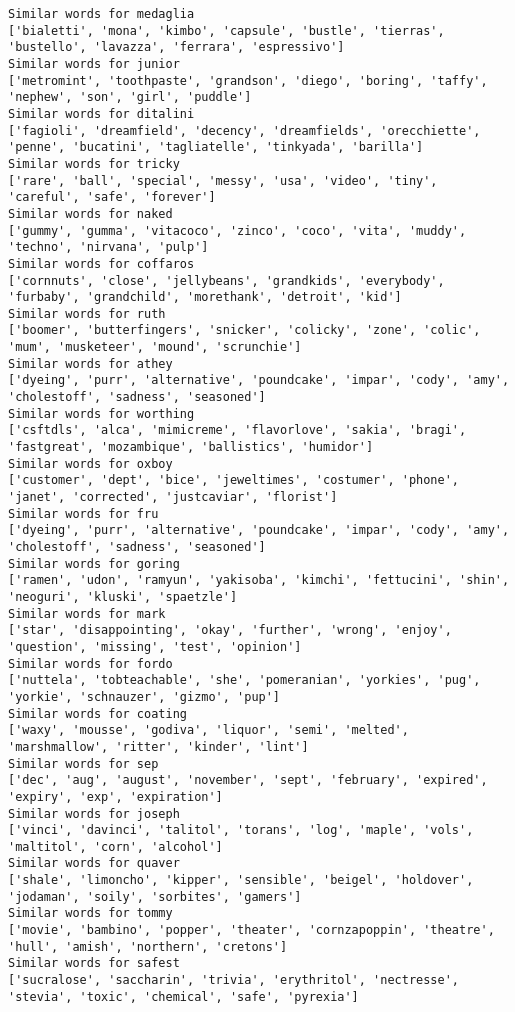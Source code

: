 \documentclass[11pt]{article}
\begin{document}
\begin{Verbatim}[commandchars=\\\{\}]
Similar words for medaglia
['bialetti', 'mona', 'kimbo', 'capsule', 'bustle', 'tierras', 'bustello', 'lavazza', 'ferrara', 'espressivo']
Similar words for junior
['metromint', 'toothpaste', 'grandson', 'diego', 'boring', 'taffy', 'nephew', 'son', 'girl', 'puddle']
Similar words for ditalini
['fagioli', 'dreamfield', 'decency', 'dreamfields', 'orecchiette', 'penne', 'bucatini', 'tagliatelle', 'tinkyada', 'barilla']
Similar words for tricky
['rare', 'ball', 'special', 'messy', 'usa', 'video', 'tiny', 'careful', 'safe', 'forever']
Similar words for naked
['gummy', 'gumma', 'vitacoco', 'zinco', 'coco', 'vita', 'muddy', 'techno', 'nirvana', 'pulp']
Similar words for coffaros
['cornnuts', 'close', 'jellybeans', 'grandkids', 'everybody', 'furbaby', 'grandchild', 'morethank', 'detroit', 'kid']
Similar words for ruth
['boomer', 'butterfingers', 'snicker', 'colicky', 'zone', 'colic', 'mum', 'musketeer', 'mound', 'scrunchie']
Similar words for athey
['dyeing', 'purr', 'alternative', 'poundcake', 'impar', 'cody', 'amy', 'cholestoff', 'sadness', 'seasoned']
Similar words for worthing
['csftdls', 'alca', 'mimicreme', 'flavorlove', 'sakia', 'bragi', 'fastgreat', 'mozambique', 'ballistics', 'humidor']
Similar words for oxboy
['customer', 'dept', 'bice', 'jeweltimes', 'costumer', 'phone', 'janet', 'corrected', 'justcaviar', 'florist']
Similar words for fru
['dyeing', 'purr', 'alternative', 'poundcake', 'impar', 'cody', 'amy', 'cholestoff', 'sadness', 'seasoned']
Similar words for goring
['ramen', 'udon', 'ramyun', 'yakisoba', 'kimchi', 'fettucini', 'shin', 'neoguri', 'kluski', 'spaetzle']
Similar words for mark
['star', 'disappointing', 'okay', 'further', 'wrong', 'enjoy', 'question', 'missing', 'test', 'opinion']
Similar words for fordo
['nuttela', 'tobteachable', 'she', 'pomeranian', 'yorkies', 'pug', 'yorkie', 'schnauzer', 'gizmo', 'pup']
Similar words for coating
['waxy', 'mousse', 'godiva', 'liquor', 'semi', 'melted', 'marshmallow', 'ritter', 'kinder', 'lint']
Similar words for sep
['dec', 'aug', 'august', 'november', 'sept', 'february', 'expired', 'expiry', 'exp', 'expiration']
Similar words for joseph
['vinci', 'davinci', 'talitol', 'torans', 'log', 'maple', 'vols', 'maltitol', 'corn', 'alcohol']
Similar words for quaver
['shale', 'limoncho', 'kipper', 'sensible', 'beigel', 'holdover', 'jodaman', 'soily', 'sorbites', 'gamers']
Similar words for tommy
['movie', 'bambino', 'popper', 'theater', 'cornzapoppin', 'theatre', 'hull', 'amish', 'northern', 'cretons']
Similar words for safest
['sucralose', 'saccharin', 'trivia', 'erythritol', 'nectresse', 'stevia', 'toxic', 'chemical', 'safe', 'pyrexia']

\end{Verbatim}
\end{document}
